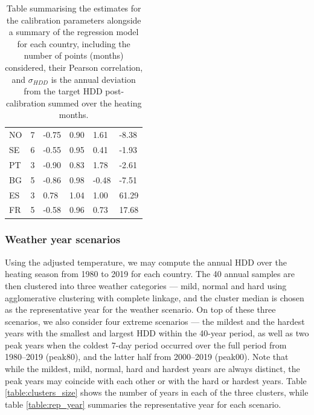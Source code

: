 \documentclass[12pt]{article}
\begin{document}
\begin{table}[h!]
\begin{tabular}{l|lllll}
NO & 7          & -0.75       & 0.90  & 1.61      & -8.38             \\
SE & 6          & -0.55       & 0.95  & 0.41      & -1.93             \\
PT & 3          & -0.90       & 0.83  & 1.78      & -2.61             \\
BG & 5          & -0.86       & 0.98  & -0.48     & -7.51             \\
ES & 3          & 0.78        & 1.04  & 1.00      & 61.29             \\
FR & 5          & -0.58       & 0.96  & 0.73      & 17.68            
\end{tabular}
\caption{Table summarising the estimates for the calibration parameters alongside a summary of the regression model for each country, including the number of points (months) considered, their Pearson correlation, and $\sigma_{HDD}$ is the annual deviation from the target HDD post-calibration summed over the heating months.} \label{table:temp_adj}
\end{table}

\subsubsection*{Weather year scenarios}
Using the adjusted temperature, we may compute the annual HDD over the heating season from 1980 to 2019 for each country. The 40 annual samples are then clustered into three weather categories --- mild, normal and hard using agglomerative clustering with complete linkage, and the cluster median is chosen as the representative year for the weather scenario. On top of these three scenarios, we also consider four extreme scenarios --- the mildest and the hardest years with the smallest and largest HDD within the 40-year period, as well as two peak years when the coldest 7-day period occurred over the full period from 1980--2019 (peak80), and the latter half from 2000--2019 (peak00). Note that while the mildest, mild, normal, hard and hardest years are always distinct, the peak years may coincide with each other or with the hard or hardest years. Table \ref{table:clusters_size} shows the number of years in each of the three clusters, while table \ref{table:rep_year} summaries the representative year for each scenario.  
\end{document}
